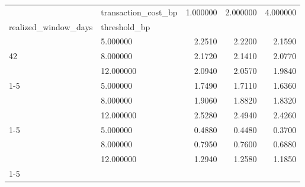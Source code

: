 \begin{tabular}{llrrr}
\toprule
 & transaction_cost_bp & 1.000000 & 2.000000 & 4.000000 \\
realized_window_days & threshold_bp &  &  &  \\
\midrule
\multirow[t]{3}{*}{42} & 5.000000 & 2.2510 & 2.2200 & 2.1590 \\
 & 8.000000 & 2.1720 & 2.1410 & 2.0770 \\
 & 12.000000 & 2.0940 & 2.0570 & 1.9840 \\
\cline{1-5}
\multirow[t]{3}{*}{63} & 5.000000 & 1.7490 & 1.7110 & 1.6360 \\
 & 8.000000 & 1.9060 & 1.8820 & 1.8320 \\
 & 12.000000 & 2.5280 & 2.4940 & 2.4260 \\
\cline{1-5}
\multirow[t]{3}{*}{84} & 5.000000 & 0.4880 & 0.4480 & 0.3700 \\
 & 8.000000 & 0.7950 & 0.7600 & 0.6880 \\
 & 12.000000 & 1.2940 & 1.2580 & 1.1850 \\
\cline{1-5}
\bottomrule
\end{tabular}
